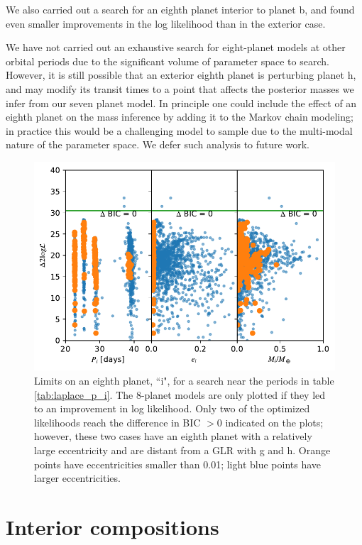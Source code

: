 \documentclass[twocolumn]{aastex63}
\begin{document}
We also carried out a search for an eighth planet interior to planet
b, and found even smaller improvements in the log likelihood than
in the exterior case.

We have not carried out an exhaustive search for eight-planet models
at other orbital periods due to the significant volume of parameter
space to search.   However, it is still possible that an exterior
eighth planet is perturbing planet h, and may modify its transit
times to a point that affects the posterior masses we infer from
our seven planet model.   In principle one could include the effect
of an eighth planet on the mass inference by adding it to the Markov
chain modeling;  in practice this would be a challenging model to
sample due to the multi-modal nature of the parameter space.
We defer such analysis to future work.

\begin{figure}
    \centering
    \includegraphics[width=\hsize]{figures/Planet_i_properties.pdf}
    \caption{Limits on an eighth planet, ``i", for a search near
    the periods in table \ref{tab:laplace_p_i}.  The 8-planet
    models are only plotted if they led to an improvement in log likelihood.  
    Only two of the optimized
    likelihoods reach the difference in BIC ${>}0$ indicated on the plots; however, these two cases have an eighth planet with a relatively large eccentricity and are distant from a GLR with g and h.  Orange points have eccentricities smaller than 0.01;  light blue points have larger eccentricities.}
    \label{fig:planet_i}
\end{figure}


\section{Interior compositions}
\label{sec:theoretical_interpretation}
\end{document}
